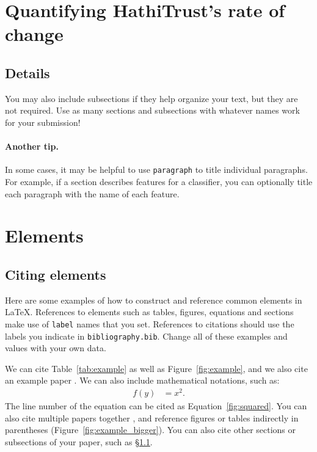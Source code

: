 \documentclass{anthology-ch}         %
\begin{document}
\section{Quantifying HathiTrust’s rate of change}

\subsection{Details} \label{sec:intro_details}

You may also include subsections if they help organize your text, but they
are not required. Use as many sections and subsections with whatever names work
for your submission!

\paragraph{Another tip.} In some cases, it may be helpful to use \texttt{paragraph} to title individual paragraphs. For example, if a section describes features for a classifier, you can optionally title each paragraph with the name of each feature. 

\section{Elements}

\subsection{Citing elements}

Here are some examples of how to construct and reference common elements in LaTeX. References to elements such as tables, figures, equations and sections make use of \texttt{label} names that you set. References to citations should use the labels you indicate in \texttt{bibliography.bib}. Change all of these examples and values with your own data. 

We can cite Table~\ref{tab:example} as well as Figure~\ref{fig:example}, and we also cite an example paper \cite{tettoni2024discoverability}.
We can also include mathematical notations, such as:
\begin{align}
f(y) &= x^2. \label{fig:squared}
\end{align}
The line number of the equation can be cited as
Equation~\ref{fig:squared}. You can also cite multiple papers together \cite{barré2024latent, levenson2024textual, bambaci2024steps}, and reference figures or tables indirectly in parentheses (Figure~\ref{fig:example_bigger}). You can also cite other sections or subsections of your paper, such as \S\ref{sec:intro_details}. 
\end{document}
